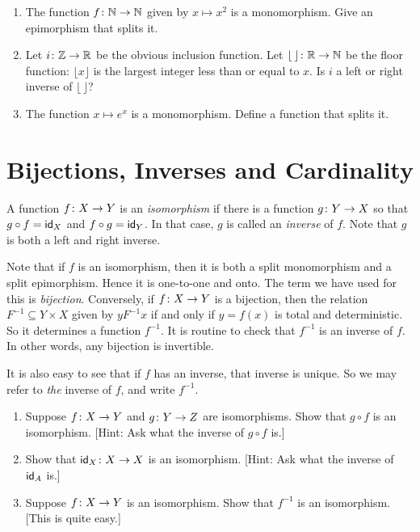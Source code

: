 \begin{exercises}
	\begin{enumerate}
	\item The function ${f}\colon{\mathbb N}\to{\mathbb N}$ given by $x\mapsto x^2$ is a monomorphism.
	Give an epimorphism that splits it.
	\item Let ${i}\colon{\mathbb Z}\to{\mathbb R}$ be the obvious inclusion function. Let ${\lfloor\,\rfloor}\colon{\mathbb R}\to{\mathbb N}$ be the floor function: $\lfloor x\rfloor$ is the largest integer less than or equal to $x$. Is $i$ a left or right inverse of $\lfloor\,\rfloor$?
	\item The function $x\mapsto e^x$ is a monomorphism. Define a function that splits it.
	\end{enumerate}
\end{exercises}

\section{Bijections, Inverses and Cardinality}

\begin{defn}
	A function ${f}\colon{X}\to{Y}$ is an \emph{isomorphism} if there is a function ${g}\colon{Y}\to{X}$ so that $g\circ f = \textsf{id}_X$ and $f\circ g = \textsf{id}_Y$. In that case, $g$ is called an \emph{inverse} of $f$. Note that $g$ is both a left and right inverse. 
\end{defn}

Note that if $f$ is an isomorphism, then it is both a split monomorphism and a split epimorphism. 
Hence it is one-to-one and onto. 
The term we have used for this is \emph{bijection}.
Conversely, if ${f}\colon{X}\to{Y}$ is a bijection, then the relation $F^{-1}\subseteq Y\times X$ given by $y\mathrel{F^{-1}} x$ if and only if $y = f(x)$ is total and deterministic.
So it determines a function $f^{-1}$.
It is routine to check that $f^{-1}$ is an inverse of $f$. In other words, any bijection is invertible.

It is also easy to see that if $f$ has an inverse, that inverse is unique. 
So we may refer to \emph{the} inverse of $f$, and write $f^{-1}$. 

\begin{exercises}
	\begin{enumerate}
		\item Suppose ${f}\colon{X}\to{Y}$ and ${g}\colon{Y}\to{Z}$ are isomorphisms. Show that $g\circ f$ is an isomorphism. [Hint: Ask what the inverse of $g\circ f$ is.]
		\item Show that ${\textsf{id}_X}\colon{X}\to{X}$ is an isomorphism. [Hint: Ask what the inverse of $\textsf{id}_A$ is.]
		\item Suppose ${f}\colon{X}\to{Y}$ is an isomorphism. Show that $f^{-1}$ is an isomorphism. [This is quite easy.]
	\end{enumerate}
\end{exercises}

